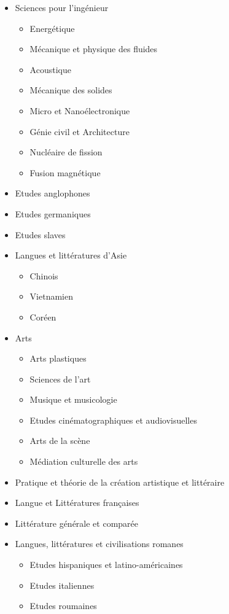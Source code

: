 	\label{ed-353-sciences-pour-lingenieur-mecanique-physique-micro-et-nanoelectronique}

		\begin{itemize}
		\item Sciences pour l'ingénieur
			\begin{itemize}
			\item Energétique
			\item Mécanique et physique des fluides 
			\item Acoustique
			\item Mécanique des solides
			\item Micro et Nanoélectronique
			\item Génie civil et Architecture
			\item Nucléaire de fission 
			\item Fusion magnétique
			\end{itemize}
		\end{itemize}

	\label{ed-354-langues-lettres-et-arts}

		\begin{itemize}
		\item Etudes anglophones
		\item Etudes germaniques
		\item Etudes slaves
		\item Langues et littératures d'Asie
			\begin{itemize}
			\item Chinois
			\item Vietnamien
			\item Coréen
			\end{itemize}
        	\item Arts
            		\begin{itemize}
            		\item Arts plastiques 
            		\item Sciences de l'art
            		\item Musique et musicologie
            		\item Etudes cinématographiques et audiovisuelles
            		\item Arts de la scène
            		\item Médiation culturelle des arts
            		\end{itemize}
        	\item Pratique et théorie de la création artistique et littéraire
		\item Langue et Littératures françaises
		\item Littérature générale et comparée
		\item Langues, littératures et civilisations romanes 
			\begin{itemize}
			\item Etudes hispaniques et latino-américaines
			\item Etudes italiennes
			\item Etudes roumaines
			\end{itemize}
		\end{itemize}

